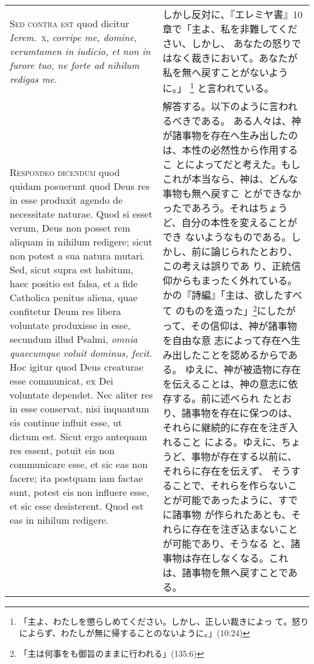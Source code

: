 \documentclass[10pt]{jsarticle} %
\begin{document}
\begin{longtable}{p{21em}p{21em}}
\\


{\scshape  Sed contra est} quod dicitur {\it Ierem}.~{\scshape x},
{\itshape corripe me, domine, verumtamen in iudicio, et non in furore tuo, ne
forte ad nihilum redigas me}.

&

しかし反対に、『エレミヤ書』10章で「主よ、私を非難してください、しかし、
 あなたの怒りではなく裁きにおいて。あなたが私を無へ戻すことがないように。」
 \footnote{「主よ、わたしを懲らしめてください。しかし、正しい裁きによっ
 て。怒りによらず、わたしが無に帰することのないように。」(10:24)}
 と言われている。

\\


{\scshape Respondeo dicendum} quod quidam posuerunt quod
Deus res in esse produxit agendo de necessitate naturae. Quod si esset
verum, Deus non posset rem aliquam in nihilum redigere; sicut non potest
a sua natura mutari. Sed, sicut supra est habitum, haec positio est
falsa, et a fide Catholica penitus aliena, quae confitetur Deum res
libera voluntate produxisse in esse, secundum illud Psalmi, {\itshape omnia
quaecumque voluit dominus, fecit}. Hoc igitur quod Deus creaturae esse
communicat, ex Dei voluntate dependet. Nec aliter res in esse conservat,
nisi inquantum eis continue influit esse, ut dictum est. Sicut ergo
antequam res essent, potuit eis non communicare esse, et sic eas non
facere; ita postquam iam factae sunt, potest eis non influere esse, et
sic esse desisterent. Quod est eas in nihilum redigere.

&

解答する。以下のように言われるべきである。
ある人々は、神が諸事物を存在へ生み出したのは、本性の必然性から作用するこ
 とによってだと考えた。もしこれが本当なら、神は、どんな事物も無へ戻すこ
 とができなかったであろう。それはちょうど、自分の本性を変えることができ
 ないようなものである。しかし、前に論じられたとおり、この考えは誤りであ
 り、正統信仰からもまったく外れている。かの『詩編』「主は、欲したすべて
 のものを造った」\footnote{「主は何事をも御旨のままに行われる」(135:6)}にしたがって、その信仰は、神が諸事物を自由な意
 志によって存在へ生み出したことを認めるからである。
ゆえに、神が被造物に存在を伝えることは、神の意志に依存する。前に述べられ
 たとおり、諸事物を存在に保つのは、それらに継続的に存在を注ぎ入れること
 による。ゆえに、ちょうど、事物が存在する以前に、それらに存在を伝えず、
 そうすることで、それらを作らないことが可能であったように、すでに諸事物
 が作られたあとも、それらに存在を注ぎ込まないことが可能であり、そうなる
 と、諸事物は存在しなくなる。これは、諸事物を無へ戻すことである。


\end{longtable}
\end{document}
